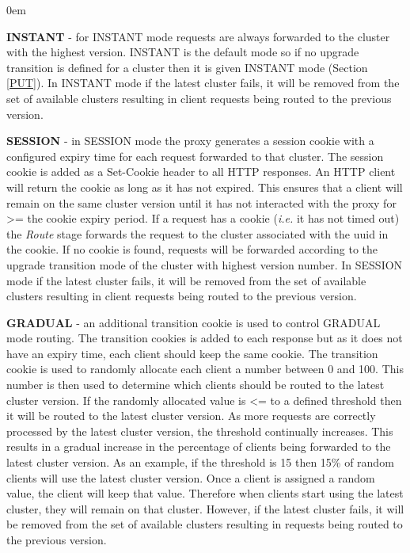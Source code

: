 \documentclass[a4paper,11pt,twoside]{article}
\begin{document}
\begin{list}{-}{}
  \itemsep0em
  \item{\textbf{INSTANT}} - for INSTANT mode requests are always forwarded to the cluster with the highest version.  INSTANT is the default mode so if no upgrade transition is defined for a cluster then it is given INSTANT mode (Section \ref{PUT}).  In INSTANT mode if the latest cluster fails, it will be removed from the set of available clusters resulting in client requests being routed to the previous version.\medskip
  
  \item{\textbf{SESSION}} -  in SESSION mode the proxy generates a  session cookie with a configured expiry time for each request forwarded to that cluster. The session cookie is added as a Set-Cookie header to all HTTP responses. An HTTP client will return the cookie as long as it has not expired.  This ensures that a client will remain on the same cluster version until it has not interacted with the proxy for >= the cookie expiry period.  If a request has a cookie (\textit{i.e.} it has not timed out) the \textit{Route} stage forwards the request to the cluster associated with the uuid in the cookie.  If no cookie is found, requests will be forwarded according to the upgrade transition mode of the cluster with highest version number.  In SESSION mode if the latest cluster fails, it will be removed from the set of available clusters resulting in client requests being routed to the previous version.\medskip
  
   \item{\textbf{GRADUAL}} - an additional transition cookie is used to control GRADUAL mode routing.  The transition cookies is added to each response but as it does not have an expiry time, each client should keep the same cookie. The transition cookie is used to randomly allocate each client a number between 0 and 100. This number is then used to determine which clients should be routed to the latest cluster version.   If the randomly allocated value is <= to a defined threshold then it will be routed to the latest cluster version. As more requests are correctly processed by the latest cluster version, the threshold continually increases.  This results in a gradual increase in the percentage of clients being forwarded to the latest cluster version.  As an example, if the threshold is 15 then 15\% of random clients will use the latest cluster version.  Once a client is assigned a random value, the client will keep that value. Therefore when clients start using the latest cluster, they will remain on that cluster.  However, if the latest cluster fails, it will be removed from the set of available clusters resulting in requests being routed to the previous version. \medskip
   

\end{list}
\end{document}
